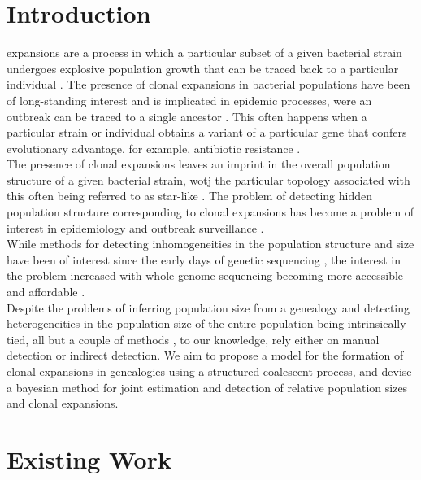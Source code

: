 \documentclass{ieeeaccess}
\theoremstyle{definition}
\begin{document}
\section{Introduction}
 expansions are a process in which a particular subset of a given bacterial strain undergoes explosive population growth that can be traced back to a particular individual \cite{smith_how_1993}. The presence of clonal expansions in bacterial populations have been of long-standing interest and is implicated in epidemic processes, were an outbreak can be traced to a single ancestor \cite{smith_how_1993,spratt_displaying_2004,fraser_neutral_2005,ledda_re-emergence_2017}. This often happens when a particular strain or individual obtains a variant of a particular gene that confers evolutionary advantage, for example, antibiotic resistance \cite{holden_genomic_2013,hsu_evolutionary_2015, ledda_re-emergence_2017}.\\
The presence of clonal expansions leaves an imprint in the overall population structure of a given bacterial strain, wotj the particular topology associated with this often being referred to as star-like \cite{smith_how_1993,spratt_displaying_2004}.
The problem of detecting hidden population structure corresponding to clonal expansions has become a problem of interest in epidemiology and outbreak surveillance \cite{volz_identification_nodate}.\\
While methods for detecting inhomogeneities in the population structure and size have been of interest since the early days of genetic sequencing \cite{smith_how_1993,spratt_displaying_2004}, the interest in the problem increased with whole genome sequencing becoming more accessible and affordable \cite{holden_genomic_2013,dearlove_measuring_2015,eldholm_four_2015}.\\
Despite the problems of inferring population size from a genealogy and detecting heterogeneities in the population size of the entire population being intrinsically tied, all but a couple of methods \cite{volz_identification_nodate,barido-sottani_multitype_2020}, to our knowledge, rely either on manual detection or indirect detection. We aim to propose a model for the formation of clonal expansions in genealogies using a structured coalescent process, and devise a bayesian method for joint estimation and detection of relative population sizes and clonal expansions.
\section{Existing Work}
\end{document}
